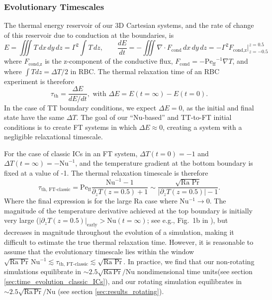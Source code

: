 \documentclass[aps, pre, onecolumn, nofootinbib, notitlepage, groupedaddress, amsfonts, amssymb, amsmath, longbibliography, superscriptaddress]{revtex4-1}
\newcommand{\grad}{\ensuremath{\nabla}}
\newcommand{\Peff}{\ensuremath{\text{Pe}_{\text{ff}}}}
\newcommand{\ea}[1]{{\color{red} #1}}
\begin{document}
\ea{
\subsubsection{Evolutionary Timescales}
The thermal energy reservoir of our 3D Cartesian systems, and the rate of change of this reservoir due to conduction at the boundaries, is
\begin{equation}
E = \iiint T\,dx\,dy\,dz = \Gamma^2 \int T\,dz,
\qquad
\frac{dE}{dt} = -\iiint \grad\cdot F_{\text{cond}}\,dx\,dy\,dz = -\Gamma^2 F_{\text{cond,z}}\bigg|_{z=-0.5}^{z=0.5}
\end{equation}
where $F_{\text{cond,z}}$ is the z-component of the conductive flux, $F_{\text{cond}} = -\Peff^{-1}\grad T$, and where $\int T dz = \Delta T / 2$ in RBC.
The thermal relaxation time of an RBC experiment is therefore
\begin{equation}
\tau_{\text{th}} = \frac{\Delta E}{dE/dt},
\,\,\text{with}\,\,
\Delta E = E(t=\infty) - E(t=0).
\end{equation}
In the case of TT boundary conditions, we expect $\Delta E = 0$, as the initial and final state have the same $\Delta T$.
The goal of our ``Nu-based'' and TT-to-FT initial conditions is to create FT systems in which $\Delta E \approx 0$, creating a system with a negligible relaxational timescale.

For the case of classic ICs in an FT system, $\Delta T(t=0) = -1$ and $\Delta T(t=\infty) = -\text{Nu}^{-1}$, and the temperature gradient at the bottom boundary is fixed at a value of -1.
The thermal relaxation timescale is therefore
\begin{equation}
\tau_{\text{th, FT-classic}} = \Peff \frac{\text{Nu}^{-1} - 1}{\partial_z T(z=0.5) + 1} \sim \frac{\sqrt{\text{Ra Pr}}}{|\partial_z T(z = 0.5)| - 1}.
\end{equation}
Where the final expression is for the large Ra case where Nu$^{-1} \rightarrow 0$.
The magnitude of the temperature derivative achieved at the top boundary is initially very large ($|\partial_z T(z=0.5)|_{\text{early}} > \text{Nu}(t=\infty)$; see e.g., Fig.~1b in \cite{anders&all2018}), but decreases in magnitude throughout the evolution of a simulation, making it difficult to estimate the true thermal relaxation time.
However, it is reasonable to assume that the evolutionary timescale lies within the window $\sqrt{\text{Ra Pr}} \,\text{Nu}^{-1} \lesssim \tau_{\text{th, FT-classic}} \lesssim \sqrt{\text{Ra Pr}}$.
In practice, we find that our non-rotating simulations equilibrate in $\sim 2.5\sqrt{\text{Ra}\,\text{Pr}}/\text{Nu}$ nondimensional time units(see section \ref{sec:time_evolution_classic_ICs}), and our rotating simulation equilibrates in $\sim 2.5\sqrt{\text{Ra}\,\text{Pr}}/\text{Nu}$ (see section \ref{sec:results_rotating}).



}
\end{document}
